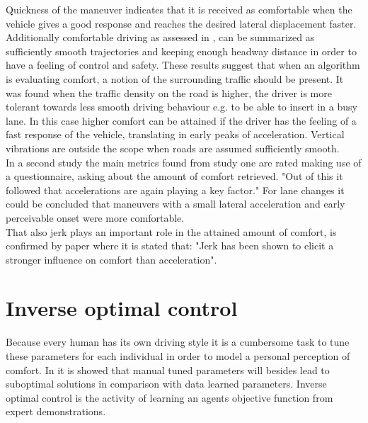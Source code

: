 Quickness of the maneuver indicates that it is received as comfortable when the vehicle gives a good response and reaches the desired lateral displacement faster.
Additionally comfortable driving as assessed in \cite{Bellem}, can be summarized as  sufficiently smooth trajectories and keeping enough headway distance in order to have a feeling of control and safety. These results suggest that when an algorithm is evaluating comfort, a notion of the surrounding traffic should be present. It was found when the traffic density on the road is higher, the driver is more tolerant towards less smooth driving behaviour e.g. to be able to insert in a busy lane. In this case higher comfort can be attained if the driver has the feeling of a fast response of the vehicle, translating in early peaks of acceleration. Vertical vibrations are outside the scope when roads are assumed sufficiently smooth.\\

In a second study the main metrics found from study one are rated making use of a questionnaire, asking about the amount of comfort retrieved. "Out of this it followed that accelerations are again playing a key factor." \cite{Bellem} For lane changes it could be concluded that maneuvers with a small lateral acceleration and early perceivable onset were more comfortable.\\

That also jerk plays an important role in the attained amount of comfort, is confirmed by paper \cite{Gianna1996} where it is stated that: "Jerk has been shown to elicit a stronger influence on comfort than acceleration".




\section{Inverse optimal control}
\label{s:inverse re le}
Because every human has its own driving style it is a cumbersome task to tune these parameters for each individual in order to model a personal perception of comfort. In \cite{Powers} it is showed that manual tuned parameters will besides lead  to suboptimal solutions in comparison with data learned parameters. 
Inverse optimal control is the activity of learning an agents objective function from expert demonstrations. \cite{Arenz2017} \\


